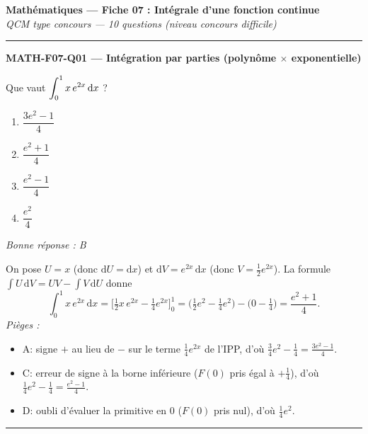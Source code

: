 \documentclass[11pt,a4paper]{article}
\begin{document}
\begin{center}
{\large\textbf{Mathématiques — Fiche 07 : Intégrale d'une fonction continue}}\\[2pt]
{\itshape QCM type concours — 10 questions (niveau concours difficile)}
\end{center}
\vspace{6pt}\hrule\vspace{10pt}

\noindent\textbf{MATH-F07-Q01 --- Intégration par parties (polynôme $\times$ exponentielle)}\par
Que vaut $\displaystyle\int_{0}^{1} x\,e^{2x}\,\mathrm{d}x$ ?
\begin{enumerate}[label=\Alph*)]
\item $\dfrac{3e^{2}-1}{4}$
\item $\dfrac{e^{2}+1}{4}$
\item $\dfrac{e^{2}-1}{4}$
\item $\dfrac{e^{2}}{4}$
\end{enumerate}
\textit{Bonne réponse : B}\par
On pose $U=x$ (donc $\mathrm{d}U=\mathrm{d}x$) et $\mathrm{d}V=e^{2x}\,\mathrm{d}x$ (donc $V=\tfrac12 e^{2x}$). La formule $\int U\,\mathrm{d}V=UV-\int V\,\mathrm{d}U$ donne
\[
\int_{0}^{1} x\,e^{2x}\,\mathrm{d}x=\Big[\tfrac12 x\,e^{2x}-\tfrac14 e^{2x}\Big]_{0}^{1}
=\Big(\tfrac12 e^{2}-\tfrac14 e^{2}\Big)-\Big(0-\tfrac14\Big)=\dfrac{e^{2}+1}{4}.
\]
\textit{Pièges :}
\begin{itemize}
\item A: signe $+$ au lieu de $-$ sur le terme $\tfrac14 e^{2x}$ de l'IPP, d'où $\tfrac34 e^{2}-\tfrac14=\tfrac{3e^{2}-1}{4}$.
\item C: erreur de signe à la borne inférieure ($F(0)$ pris égal à $+\tfrac14$), d'où $\tfrac14 e^{2}-\tfrac14=\tfrac{e^{2}-1}{4}$.
\item D: oubli d'évaluer la primitive en $0$ ($F(0)$ pris nul), d'où $\tfrac14 e^{2}$.
\end{itemize}
\vspace{8pt}\hrule\vspace{8pt}
\end{document}
